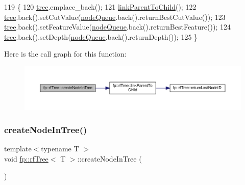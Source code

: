 \begin{DoxyCode}
119                                               \{
120                     \hyperlink{classtree}{tree}.emplace\_back();
121                     \hyperlink{classfp_1_1rfTree_aceaedc5d54bb429c1a3539f164a93d45}{linkParentToChild}();
122                     \hyperlink{classtree}{tree}.back().setCutValue(\hyperlink{classfp_1_1rfTree_af72d0a2f930fd480dfb4858885c2df23}{nodeQueue}.back().returnBestCutValue());
123                     \hyperlink{classtree}{tree}.back().setFeatureValue(\hyperlink{classfp_1_1rfTree_af72d0a2f930fd480dfb4858885c2df23}{nodeQueue}.back().returnBestFeature());
124                     \hyperlink{classtree}{tree}.back().setDepth(\hyperlink{classfp_1_1rfTree_af72d0a2f930fd480dfb4858885c2df23}{nodeQueue}.back().returnDepth());
125                 \}
\end{DoxyCode}
Here is the call graph for this function\+:
\nopagebreak
\begin{figure}[H]
\begin{center}
\leavevmode
\includegraphics[width=350pt]{classfp_1_1rfTree_aaf9d8cdfbb1d10da53a375ea8204e393_cgraph}
\end{center}
\end{figure}
\mbox{\label{classfp_1_1rfTree_aaf9d8cdfbb1d10da53a375ea8204e393}} 
\subsubsection{\texorpdfstring{create\+Node\+In\+Tree()}{createNodeInTree()}\hspace{0.1cm}{\footnotesize\ttfamily [2/2]}}
{\footnotesize\ttfamily template$<$typename T $>$ \\
void \hyperlink{classfp_1_1rfTree}{fp\+::rf\+Tree}$<$ T $>$\+::create\+Node\+In\+Tree (\begin{DoxyParamCaption}{ }\end{DoxyParamCaption})\hspace{0.3cm}{\ttfamily [inline]}}



